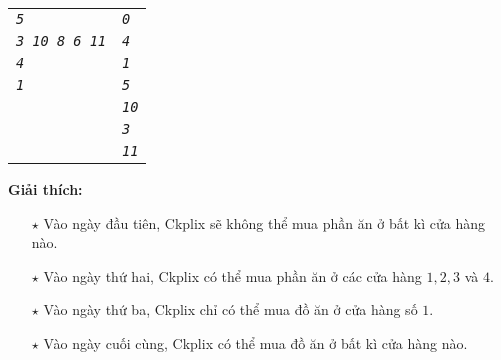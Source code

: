 \begin{ex}
\begin{center}
\begin{tabular}{|l|l|}
			\hline
			\textit{\texttt{5}} & \textit{\texttt{0}} \\ %
			\textit{\texttt{3 10 8 6 11}} & \textit{\texttt{4}} \\ %
			\textit{\texttt{4}} & \textit{\texttt{1}} \\ %
			\textit{\texttt{1}} & \textit{\texttt{5}} \\ %
			& \textit{\texttt{10}} \\
			& \textit{\texttt{3}} \\
			& \textit{\texttt{11}} \\
			\hline
		\end{tabular}
	\end{center}
	\textbf{Giải thích: }
	\begin{itemize}
		\item[$\star$] Vào ngày đầu tiên, Ckplix sẽ không thể mua phần ăn ở bất kì cửa hàng nào. 
		\item[$\star$] Vào ngày thứ hai, Ckplix có thể mua phần ăn ở các cửa hàng $1,2,3$ và $4$. 
		\item[$\star$] Vào ngày thứ ba, Ckplix chỉ có thể mua đồ ăn ở cửa hàng số $1$. 
		\item[$\star$] Vào ngày cuối cùng, Ckplix có thể mua đồ ăn ở bất kì cửa hàng nào. 
	\end{itemize}
\end{ex}


